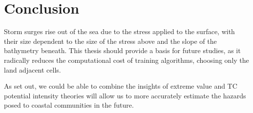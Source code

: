 \section{Conclusion}
\label{sec:8_Conclusion}

Storm surges rise out of the sea due to the stress applied to the surface,
with their size dependent to the size of the stress above and
the slope of the bathymetry beneath. This thesis should provide a basis for
future studies, as it radically reduces the computational cost
of training algorithms, choosing only the
land adjacent cells.

As set out, we could be able to combine the insights of
extreme value and TC potential intensity theories will allow
us to more accurately estimate the hazards posed to coastal communities
in the future.

